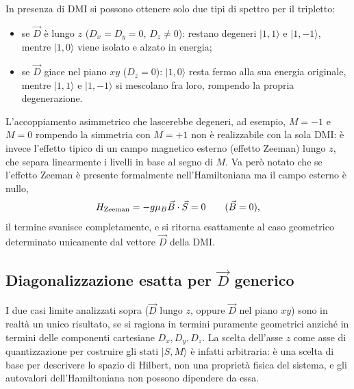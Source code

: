\documentclass[11pt,a4paper]{article}
\begin{document}
In presenza di DMI si possono ottenere solo due tipi di spettro per il tripletto:
\begin{itemize}
\item se $\vec D$ \`e lungo $z$ ($D_x=D_y=0$, $D_z\neq0$): restano degeneri
$|1,1\rangle$ e $|1,-1\rangle$, mentre $|1,0\rangle$ viene isolato e alzato in
energia;
\item se $\vec D$ giace nel piano $xy$ ($D_z=0$): $|1,0\rangle$ resta fermo alla sua
energia originale, mentre $|1,1\rangle$ e $|1,-1\rangle$ si mescolano fra loro,
rompendo la propria degenerazione.
\end{itemize}
L'accoppiamento asimmetrico che lascerebbe degeneri, ad esempio, $M=-1$ e $M=0$
rompendo la simmetria con $M=+1$ non \`e realizzabile con la sola DMI: \`e invece
l'effetto tipico di un campo magnetico esterno (effetto Zeeman) lungo $z$, che separa
linearmente i livelli in base al segno di $M$. Va per\`o notato che se l'effetto
Zeeman \`e presente formalmente nell'Hamiltoniana ma il campo esterno \`e nullo,
$$H_{\rm Zeeman} = -g\mu_B\vec B\cdot\vec S = 0 \qquad (\vec B=0),$$
il termine svanisce completamente, e si ritorna esattamente al caso geometrico
determinato unicamente dal vettore $\vec D$ della DMI.

\subsection{Diagonalizzazione esatta per $\vec D$ generico}

I due casi limite analizzati sopra ($\vec D$ lungo $z$, oppure $\vec D$ nel piano
$xy$) sono in realt\`a un unico risultato, se si ragiona in termini puramente
geometrici anzich\'e in termini delle componenti cartesiane $D_x,D_y,D_z$. La scelta
dell'asse $z$ come asse di quantizzazione per costruire gli stati $|S,M\rangle$ \`e
infatti arbitraria: \`e una scelta di base per descrivere lo spazio di Hilbert, non
una propriet\`a fisica del sistema, e gli autovalori dell'Hamiltoniana non possono
dipendere da essa.
\end{document}
